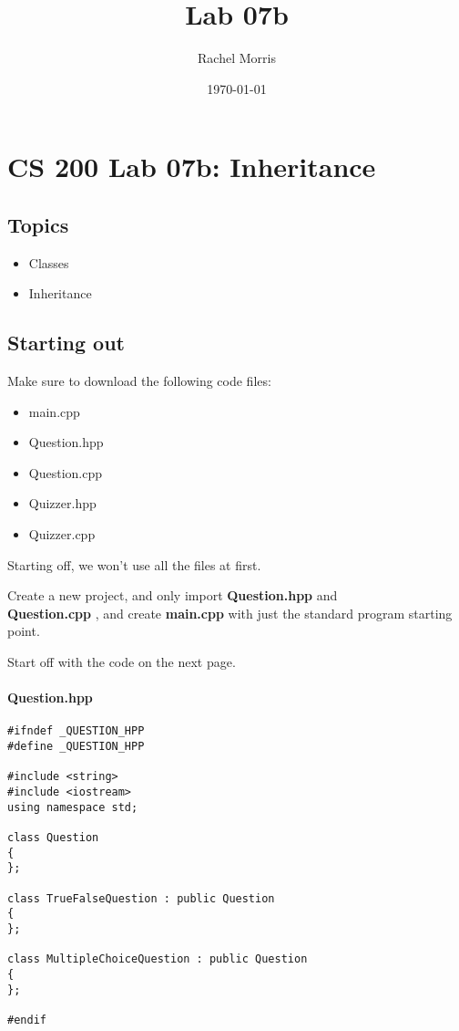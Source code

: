 \documentclass[a4paper,12pt]{book}
\author{Rachel Morris}
\date{\today}
\title{ Lab 07b }
\begin{document}
    
    \chapter*{CS 200 Lab 07b: Inheritance} 
        \section*{Topics}
        
            \begin{itemize}
                \item Classes
                \item Inheritance
            \end{itemize}

        \section*{Starting out}

            Make sure to download the following code files:

            \begin{itemize}
                \item main.cpp
                \item Question.hpp
                \item Question.cpp
                \item Quizzer.hpp
                \item Quizzer.cpp
            \end{itemize}

            Starting off, we won't use all the files at first.

            Create a new project, and only import \textbf{ Question.hpp }
            and \\ \textbf{ Question.cpp }, and create \textbf{ main.cpp } with
            just the standard program starting point.

            Start off with the code on the next page.

            \newpage            
                \subsubsection*{Question.hpp}
\begin{lstlisting}[style=code]
#ifndef _QUESTION_HPP
#define _QUESTION_HPP

#include <string>
#include <iostream>
using namespace std;

class Question
{
};

class TrueFalseQuestion : public Question
{
};

class MultipleChoiceQuestion : public Question
{
};

#endif
\end{lstlisting}
\end{document}
